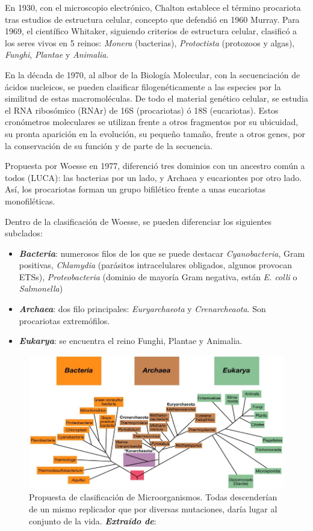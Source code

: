 En 1930, con el microscopio electrónico, Chalton establece el término procariota tras estudios de estructura celular, concepto que defendió en 1960 Murray. Para 1969, el científico Whitaker, siguiendo criterios de estructura celular, clasificó a los seres vivos en 5 reinos: \textit{Monera} (bacterias), \textit{Protoctista} (protozoos y algas), \textit{Funghi}, \textit{Plantae} y \textit{Animalia}.

En la década de 1970, al albor de la Biología Molecular, con la secuenciación de ácidos nucleicos, se pueden clasificar filogenéticamente a las especies por la similitud de estas macromoléculas. De todo el material genético celular, se estudia el RNA ribosómico (RNAr) de 16S (procariotas) ó 18S (eucariotas). Estos cronómetros moleculares se utilizan frente a otros fragmentos por su ubicuidad, su pronta aparición en la evolución, su pequeño tamaño, frente a otros genes, por la conservación de su función y de parte de la secuencia.

Propuesta por Woesse en 1977, diferenció tres dominios con un ancestro común a todos (LUCA): las bacterias por un lado, y Archaea y eucariontes por otro lado. Así, los procariotas forman un grupo bifilético frente a unas eucariotas monofiléticas.

Dentro de la clasificación de Woesse, se pueden diferenciar los siguientes subclados:
\begin{itemize}[itemsep=0pt,parsep=0pt,topsep=0pt,partopsep=0pt]
	\item \textit{\textbf{Bacteria}}: numerosos filos de los que se puede destacar \textit{Cyanobacteria}, Gram positivas, \textit{Chlamydia} (parásitos intracelulares obligados, algunos provocan ETSs), \textit{Proteobacteria} (dominio de mayoría Gram negativa, están \textit{E. colli} o \textit{Salmonella})
	\item \textit{\textbf{Archaea}}: dos filo principales: \textit{Euryarchaeota} y \textit{Crenarcheaota}. Son procariotas extremófilos.
	\item\textbf{\textit{Eukarya}}: se encuentra el reino Funghi, Plantae y Animalia.
\end{itemize}
\begin{figure}[H]
	\centering
	\includegraphics[width=\columnwidth]{A.imagenes/ACV-MICROBIO-PropuestaClasificacion}
	\caption[Propuesta de clasificación de Microorganismos]{Propuesta de clasificación de Microorganismos. Todas descenderían de un mismo replicador que por diversas mutaciones, daría lugar al conjunto de la vida. \textit{\textbf{Extraído de}}: \cite{Prescott2011}}
\end{figure}
